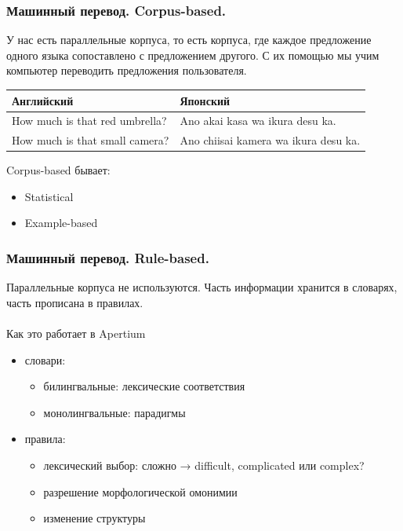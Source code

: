 \documentclass[10pt, compress]{beamer}
\begin{document}
\begin{frame}
  \frametitle{Машинный перевод. Corpus-based.} 
У нас есть параллельные корпуса, то есть корпуса, где каждое предложение одного языка сопоставлено с предложением другого. С их помощью мы учим компьютер переводить предложения пользователя.
  \begin{table}
    \begin{tabular}{ll}
      Английский & Японский\\
      \toprule
      How much is that red umbrella? & Ano akai kasa wa ikura desu ka.\\
      \midrule
      How much is that small camera? & Ano chiisai kamera wa ikura desu ka.\\
      \bottomrule
    \end{tabular}
  \end{table}
Corpus-based бывает:
\begin{itemize}
\item Statistical
\item Example-based
\end{itemize}
\end{frame}

\begin{frame}
  \frametitle{Машинный перевод. Rule-based.} 
Параллельные корпуса не используются. Часть информации хранится в словарях, часть прописана в правилах.\\\\
Как это работает в Apertium
	\begin{itemize}
	\item словари:
    \begin{itemize}
    	\item билингвальные: лексические соответствия
		\item монолингвальные: парадигмы
	\end{itemize}
    \item правила:
    \begin{itemize}
        \item лексический выбор: сложно → difficult, complicated или complex?
        \item разрешение морфологической омонимии
        \item изменение структуры
    \end{itemize}
    \end{itemize}
\end{frame}
\end{document}

